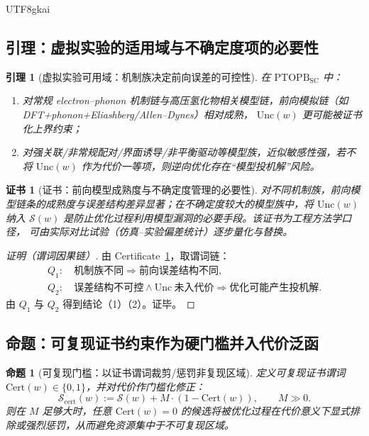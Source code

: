 \documentclass[12pt]{article}
\newtheorem{proposition}{命题}[section]
\newtheorem{lemma}{引理}[section]
\newtheorem{certificate}{证书}[section]
\newcommand{\PTOPB}{\ensuremath{\mathrm{PTOPB}}}
\begin{document}
\begin{CJK*}{UTF8}{gkai}
\subsection{引理：虚拟实验的适用域与不确定度项的必要性}

\begin{lemma}[虚拟实验可用域：机制族决定前向误差的可控性]
\label{lem:insilico-validity}
在 \PTOPB$_{\mathrm{SC}}$ 中：
\begin{enumerate}
  \item 对常规 electron--phonon 机制链与高压氢化物相关模型链，前向模拟链（如
  DFT+\allowbreak phonon+\allowbreak Eliashberg/\allowbreak Allen--Dynes）相对成熟，
  $\mathrm{Unc}(w)$ 更可能被证书化上界约束；
  \item 对强关联/非常规配对/界面诱导/非平衡驱动等模型族，近似敏感性强，若不将 $\mathrm{Unc}(w)$ 作为代价一等项，则逆向优化存在“模型投机解”风险。
\end{enumerate}
\end{lemma}

\begin{certificate}[证书：前向模型成熟度与不确定度管理的必要性]
\label{cert:uncertainty-necessity}
对不同机制族，前向模型链条的成熟度与误差结构差异显著；在不确定度较大的模型族中，将 $\mathrm{Unc}(w)$ 纳入 $\mathcal{S}(w)$ 是防止优化过程利用模型漏洞的必要手段。该证书为工程方法学口径，
  可由实际对比试验（仿真--实验偏差统计）逐步量化与替换。
\end{certificate}

\begin{proof}[证明（谓词因果链）]
由 Certificate~\ref{cert:uncertainty-necessity}，取谓词链：
\[
\begin{aligned}
Q_1:&\ \text{机制族不同}\Rightarrow \text{前向误差结构不同},\\
Q_2:&\ \text{误差结构不可控}\wedge \mathrm{Unc}\ \text{未入代价}\Rightarrow \text{优化可能产生投机解}.
\end{aligned}
\]
由 $Q_1$ 与 $Q_2$ 得到结论（1）（2）。证毕。
\end{proof}

\subsection{命题：可复现证书约束作为硬门槛并入代价泛函}

\begin{proposition}[可复现门槛：以证书谓词裁剪/惩罚非复现区域]
\label{prop:cert-gating}
定义可复现证书谓词 $\mathrm{Cert}(w)\in\{0,1\}$，并对代价作门槛化修正：
\[
\mathcal{S}_{\mathrm{cert}}(w):=\mathcal{S}(w)+M\cdot(1-\mathrm{Cert}(w)),
\qquad M\gg 0.
\]
则在 $M$ 足够大时，任意 $\mathrm{Cert}(w)=0$ 的候选将被优化过程在代价意义下显式排除或强烈惩罚，从而避免资源集中于不可复现区域。
\end{proposition}


\end{CJK*}
\end{document}
